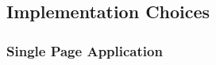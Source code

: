 \documentclass{cshonours}
\begin{document}
\subsection{Implementation Choices}

\subsubsection{Single Page Application}




\end{document}

